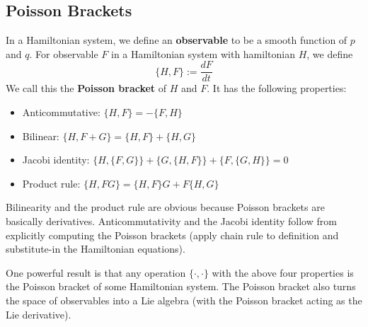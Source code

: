 \subsection{Poisson Brackets}
In a Hamiltonian system, we define an \textbf{observable} to be a smooth function of $p$ and $q$. For observable $F$ in a Hamiltonian system with hamiltonian $H$, we define
\[
    \{H, F\} := \frac{dF}{dt}
\]
We call this the \textbf{Poisson bracket} of $H$ and $F$. It has the following properties:
\begin{itemize}
    \item Anticommutative: $\{H, F\} = - \{F, H\}$
    \item Bilinear: $\{H, F + G\} = \{H, F\}+ \{H, G\}$
    \item Jacobi identity: $\{H, \{F,G\}\} + \{G, \{H, F\}\} + \{F, \{G, H\}\} = 0$
    \item Product rule: $\{H, FG\} = \{H, F\}G + F\{H, G\}$
\end{itemize}
Bilinearity and the product rule are obvious because Poisson brackets are basically derivatives. Anticommutativity and the Jacobi identity follow from explicitly computing the Poisson brackets (apply chain rule to definition and substitute-in the Hamiltonian equations).

One powerful result is that any operation $\{ \cdot, \cdot\}$ with the above four properties is the Poisson bracket of some Hamiltonian system. The Poisson bracket also turns the space of observables into a Lie algebra (with the Poisson bracket acting as the Lie derivative).
